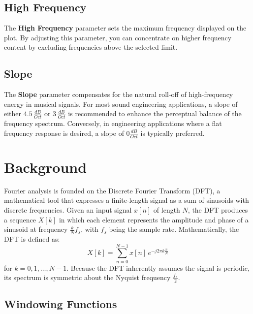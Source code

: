 \documentclass[12pt,letter]{article}
\begin{document}
\subsection{High Frequency}

The \textbf{High Frequency} parameter sets the maximum frequency displayed on
the plot. By adjusting this parameter, you can concentrate on higher
frequency content by excluding frequencies above the selected limit.

\subsection{Slope}

The \textbf{Slope} parameter compensates for the natural roll-off of
high-frequency energy in musical signals. For most sound engineering
applications, a slope of either $4.5\,\frac{dB}{Oct}$ or $3\,\frac{dB}{Oct}$
is recommended to enhance the perceptual balance of the frequency spectrum.
Conversely, in engineering applications where a flat frequency response is
desired, a slope of $0\frac{dB}{Oct}$ is typically preferred.


\clearpage
\section{Background}

Fourier analysis is founded on the Discrete Fourier Transform (DFT), a
mathematical tool that expresses a finite-length signal as a sum of sinusoids
with discrete frequencies. Given an input signal $x[n]$ of length $N$,
the DFT produces a sequence $X[k]$ in which each element represents the
amplitude and phase of a sinusoid at frequency $\frac{k}{N} f_s$, with $f_s$
being the sample rate. Mathematically, the DFT is defined as:
\begin{equation}
X[k] = \sum_{n=0}^{N-1} x[n] \, e^{-j2\pi k \frac{n}{N}}
\label{eqn:dft}
\end{equation}
for $k = 0, 1, \dots, N-1$. Because the DFT inherently assumes the signal is
periodic, its spectrum is symmetric about the Nyquist frequency
$\frac{f_s}{2}$.

\subsection{Windowing Functions}
\end{document}
